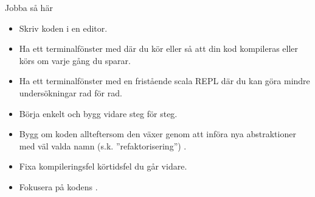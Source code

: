 \begin{SlideExtra}{Jobba så här}
\begin{itemize}
  \item Skriv koden i en editor.
  \item Ha ett terminalfönster med  där du kör  eller  så att din kod kompileras eller körs om varje gång du sparar.
  \item Ha ett terminalfönster med en fristående scala REPL där du kan göra mindre undersökningar rad för rad.
  \item Börja enkelt och bygg vidare steg för steg.
  \item Bygg om koden allteftersom den växer genom att införa nya abstraktioner med väl valda namn (s.k. ''refaktorisering'') .
  \item Fixa  kompileringsfel \code{||} körtidsfel  du går vidare.
  \item Fokusera på kodens .
\end{itemize}

\end{SlideExtra}

\fi

